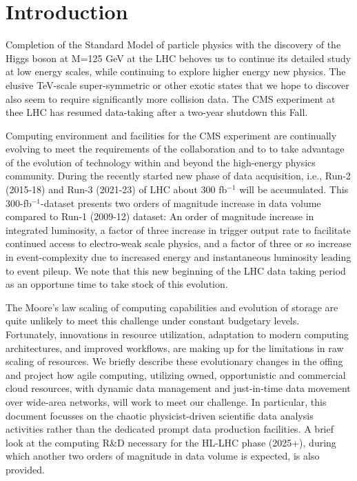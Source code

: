 \section{Introduction}

Completion of the Standard Model of particle physics with the discovery of the Higgs boson at M=125 GeV at the LHC behoves us to continue its detailed study at low energy scales, while continuing to explore higher energy new physics. The elusive TeV-scale super-symmetric or other exotic states that we hope to discover also seem to require significantly more collision data. The CMS experiment at thee LHC has resumed data-taking after a two-year shutdown this Fall.

Computing environment and facilities for the CMS experiment are continually evolving to meet the requirements of the collaboration and to to take advantage of the evolution of technology within and beyond the high-energy physics community. During the recently started new phase of data acquisition, i.e., Run-2 (2015-18) and Run-3 (2021-23) of LHC about 300 fb$^{-1}$ will be accumulated. This 300-fb$^{-1}$-dataset presents two orders of magnitude increase in data volume compared to Run-1 (2009-12) dataset: An order of magnitude increase in integrated luminosity, a factor of three increase in trigger output rate to facilitate continued access to electro-weak scale physics, and a factor of three or so increase in event-complexity due to increased energy and instantaneous luminosity leading to event pileup. We note that this new beginning of the LHC data taking period as an opportune time to take stock of this evolution. 

The Moore's law scaling of computing capabilities and evolution of storage are quite unlikely to meet this challenge under constant budgetary levels. Fortunately, innovations in resource utilization, adaptation to modern computing architectures, and improved workflows, are making up for the limitations in raw scaling of resources. We briefly describe these evolutionary changes in the offing and project how agile computing, utilizing owned, opportunistic and commercial cloud resources, with dynamic data management and just-in-time data movement over wide-area networks, will work to meet our challenge. In particular, this document focusses on the chaotic physicist-driven scientific data analysis activities rather than the dedicated prompt data production facilities. A brief look at the computing R\&D necessary for the HL-LHC phase (2025+), during which another two orders of magnitude in data volume is expected, is also provided.


